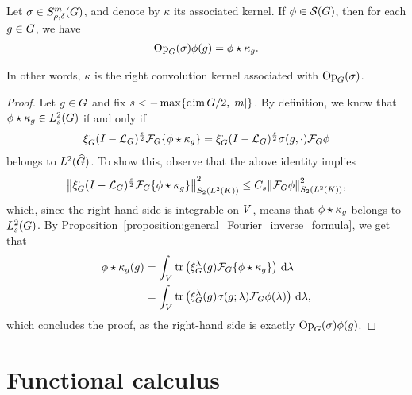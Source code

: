 \begin{proposition}[Quantisation]
\label{proposition:quantisation}
    Let $\sigma \in \SymbolClass{m}{\rho, \delta}$,
    and denote by $\kappa$ its associated kernel.
    If $\phi \in \Schwartz\Group$, then for each $g \in \Group$, we have
    \begin{align*}
        \Op(\sigma) \phi(g) = \conv{\phi}{\kappa_g}.
    \end{align*}

    In other words, $\kappa$ is the right convolution kernel associated with $\Op(\sigma)$.
\end{proposition}
\begin{proof}
    Let $g \in \Group$ and fix $s < -\max \{\dim \Group/2, \abs m\}$.
    By definition, we know that $\conv \phi \kappa_g \in \Sobolev s$ if and only if
    \begin{align*}
        \Rep \dummy \BesselPotential s \Fourier \{\conv \phi {\kappa_g}\}
        = \Rep \dummy \BesselPotential s \sigma(g, \dummy) \Fourier \phi
    \end{align*}
    belongs to $\LebesgueDual 2 \Group$.
    To show this,
    observe that the above identity implies
    \begin{align*}
        \norm[\SchattenClasses 2 {\Lebesgue 2 \CompactGroup}] {\Rep \dummy \BesselPotential s \Fourier \{\conv \phi {\kappa_g}\}}^2
        \leq C_s \norm[\SchattenClasses 2 {\Lebesgue 2 \CompactGroup}] {\Fourier \phi}^2,
    \end{align*}
    which, since the right-hand side is integrable on $\VectorSpace$,
    means that $\conv \phi {\kappa_g}$ belongs to $\Sobolev s$.
    By Proposition~\ref{proposition:general_Fourier_inverse_formula},
    we get that
    \begin{align*}
        \conv \phi {\kappa_g}(g)
        &= \int_\VectorSpace \tr\left(\Rep \lambda(g) \Fourier \{\conv \phi {\kappa_g}\}\right) \dd \lambda\\
        &= \int_\VectorSpace \tr\left(\Rep \lambda(g) \sigma(g; \lambda) \Fourier \phi(\lambda)\right) \dd \lambda,
    \end{align*}
    which concludes the proof,
    as the right-hand side is exactly $\Op(\sigma) \phi(g)$.
\end{proof}

\section{Functional calculus}

